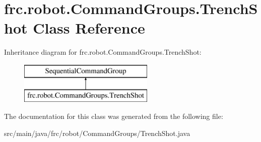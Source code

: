 \hypertarget{classfrc_1_1robot_1_1_command_groups_1_1_trench_shot}{}\section{frc.\+robot.\+Command\+Groups.\+Trench\+Shot Class Reference}
\label{classfrc_1_1robot_1_1_command_groups_1_1_trench_shot}
Inheritance diagram for frc.\+robot.\+Command\+Groups.\+Trench\+Shot\+:\begin{figure}[H]
\begin{center}
\leavevmode
\includegraphics[height=2.000000cm]{classfrc_1_1robot_1_1_command_groups_1_1_trench_shot}
\end{center}
\end{figure}


The documentation for this class was generated from the following file\+:\begin{DoxyCompactItemize}
\item 
src/main/java/frc/robot/\+Command\+Groups/Trench\+Shot.\+java\end{DoxyCompactItemize}
